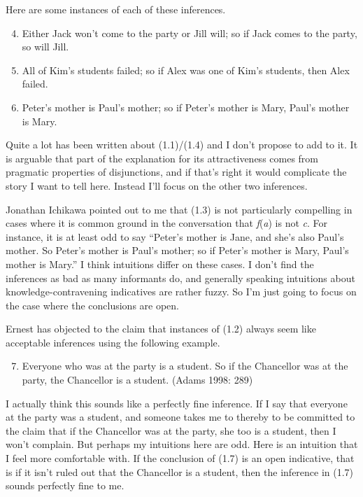 \noindent Here are some instances of each of these inferences.

\begin{enumerate}
\setcounter{enumi}{3}
\item Either Jack won't come to the party or Jill will; so if Jack comes to the party, so will Jill.

\item All of Kim's students failed; so if Alex was one of Kim's students, then Alex failed.

\item Peter's mother is Paul's mother; so if Peter's mother is Mary, Paul's mother is Mary.
\end{enumerate}

\noindent Quite a lot has been written about (1.1)/(1.4) and I don't propose to add to it. It is arguable that part of the explanation for its attractiveness comes from pragmatic properties of disjunctions, and if that's right it would complicate the story I want to tell here. Instead I'll focus on the other two inferences.

Jonathan Ichikawa pointed out to me that (1.3) is not particularly compelling in cases where it is common ground in the conversation that \textit{f}(\textit{a}) is not \textit{c}. For instance, it is at least odd to say ``Peter's mother is Jane, and she's also Paul's mother. So Peter's mother is Paul's mother; so if Peter's mother is Mary, Paul's mother is Mary.'' I think intuitions differ on these cases. I don't find the inferences as bad as many informants do, and generally speaking intuitions about knowledge-contravening indicatives are rather fuzzy. So I'm just going to focus on the case where the conclusions are open.

Ernest \citet{Adams1998} has objected to the claim that instances of (1.2) always seem like acceptable inferences using the following example.

\renewcommand{\labelenumi}{(1.\arabic{enumi})}
\begin{enumerate}
\setcounter{enumi}{6}
\item Everyone who was at the party is a student. So if the Chancellor was at the party, the Chancellor is a student. (Adams 1998: 289)
\end{enumerate}

\noindent I actually think this sounds like a perfectly fine inference. If I say that everyone at the party was a student, and someone takes me to thereby to be committed to the claim that if the Chancellor was at the party, she too is a student, then I won't complain. But perhaps my intuitions here are odd. Here is an intuition that I feel more comfortable with. If the conclusion of (1.7) is an open indicative, that is if it isn't ruled out that the Chancellor is a student, then the inference in (1.7) sounds perfectly fine to me.

